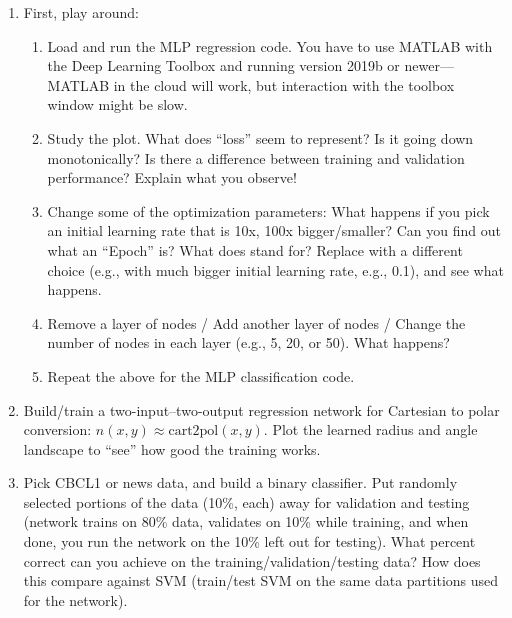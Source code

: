 \documentclass[11pt,noanswers,addpoints]{exam}
\begin{document}
\begin{enumerate}
\item First, play around:
\begin{enumerate}
\item Load and run the MLP regression code. You have to use MATLAB with the Deep Learning Toolbox and running version 2019b or newer---MATLAB in the cloud will work, but interaction with the toolbox window might be slow.
\item Study the plot. What does ``loss'' seem to represent? Is it going down monotonically? Is there a difference between training and validation performance? Explain what you observe!
\item Change some of the optimization parameters: What happens if you pick an initial learning rate that is 10x, 100x bigger/smaller? Can you find out what an ``Epoch'' is? What does  stand for? Replace  with a different choice (e.g.,  with much bigger initial learning rate, e.g.,  0.1), and see what happens.
\item Remove a layer of nodes / Add another layer of nodes / Change the number of nodes in each layer (e.g., 5, 20, or 50). What happens?
\item Repeat the above for the MLP classification code.
\end{enumerate}
\item Build/train a two-input--two-output regression network for Cartesian to polar conversion: $n(x,y) \approx \text{cart2pol}(x,y)$. Plot the learned radius and angle landscape to ``see'' how good the training works.
\item Pick CBCL1 or news data, and build a binary classifier. Put randomly selected portions of the data (10\%, each) away for validation and testing (network trains on 80\% data, validates on 10\% while training, and when done, you run the network on the 10\% left out for testing). What percent correct can you achieve on the training/validation/testing data? How does this compare against SVM (train/test SVM on the same data partitions used for the network). 
\end{enumerate}
\end{document}
